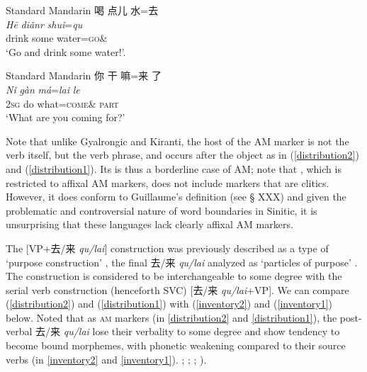 \documentclass[oneside,a4paper,11pt]{article}
\newcommand{\ipa}[1]{{\phon\textit{#1}}}
\newcommand{\zh}[1]{{\cn #1}}
\newcommand{\sens}[1]{‘#1’}
\begin{document}
\begin{exe}
\ex Standard Mandarin \citep{lamarre17deictic} \label{distribution2}
\glll
\zh{喝} \zh{点儿} \zh{水}=\zh{去} \\
\ipa{Hē} \ipa{diǎnr} \ipa{shuǐ}=\ipa{qu} \\
drink  some water=\textsc{go}$\&$ \\
\glt \sens{Go and drink some water!}.
\end{exe}

\begin{exe}
\ex Standard Mandarin \citep{lamarre17motion.cum} \label{distribution1}
\glll
\zh{你} \zh{干} \zh{嘛}=\zh{来} \zh{了} \\
\ipa{Nǐ} \ipa{gàn} \ipa{má}=\ipa{lai} \ipa{le} \\
\textsc{2sg} do what=\textsc{come}$\&$ \textsc{part} \\
\glt \sens{What are you coming for?}
\end{exe}

Note that unlike Gyalrongic and Kiranti, the host of the AM marker is not the verb itself, but the verb phrase, and occurs after the object as in (\ref{distribution2}) and (\ref{distribution1}). Its is thus a borderline case of AM; note that \citet{guillaume16am}, which is restricted to affixal AM markers, does not include markers that are  clitics. However, it does conform to Guillaume's definition (see § XXX) and given the problematic and controversial nature of word boundaries in Sinitic, it is unsurprising that these languages lack clearly affixal AM markers.

The [VP+\zh{去/来} \ipa{qu/lai}] construction was previously described as a type of \sens{purpose construction} \citetext{\citealp{lu1985vpqu}; \citealp{yang2012mudi}}, the final \zh{去/来} \ipa{qu/lai} analyzed as `particles of purpose' \citep[479]{chao68chinese}. The construction is considered to be interchangeable to some degree with the serial verb construction (henceforth SVC) [\zh{去/来} \ipa{qu/lai}+VP]. We can compare (\ref{distribution2}) and (\ref{distribution1}) with (\ref{inventory2}) and (\ref{inventory1}) below. Noted that as \textsc{am} markers (in \ref{distribution2} and \ref{distribution1}), the post-verbal \zh{去/来} \ipa{qu/lai} lose their verbality to some degree and show tendency to become bound morphemes, with phonetic weakening compared to their source verbs (in \ref{inventory2} and \ref{inventory1}). \citealp[479]{chao68chinese}; \citealp{lu1985vpqu}; \cite{lamarre17motion.cum} ; \cite{lamarre17deictic}).
\end{document}
